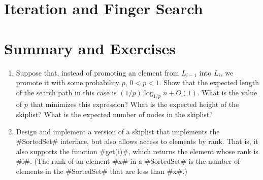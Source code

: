 \section{Iteration and Finger Search}


\section{Summary and Exercises}

\begin{enumerate}
\item Suppose that, instead of promoting an element from $L_{i-1}$ into
$L_i$, we promote it with some probability $p$, $0 < p < 1$.  Show that
the expected length of the search path in this case is $(1/p)\log_{1/p}
n + O(1)$.  What is the value of $p$ that minimizes this expression? What
is the expected height of the skiplist? What is the expected number of
nodes in the skiplist?

\item Design and implement a version of a skiplist that implements the
#SortedSet# interface, but also allows access to elements by rank.
That is, it also supports the function #get(i)#, which returns the element
whose rank is #i#. (The rank of an element #x# in a #SortedSet# is the number of elements in the #SortedSet# that are less than #x#.)
\end{enumerate}

